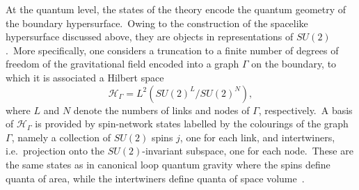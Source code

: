 \documentclass[11pt]{article}
\theoremstyle{definition}
\numberwithin{equation}{section}
\begin{document}
    At the quantum level, the states of the theory encode the quantum geometry of the boundary hypersurface.~Owing to the construction of the spacelike hypersurface discussed above, they are objects in representations of $SU(2)$.~More specifically, one considers a truncation to a finite number of degrees of freedom of the gravitational field encoded into a graph $\Gamma$ on the boundary, to which it is associated a Hilbert space
    \begin{equation}\label{eq:bdyHkin}
    \mathcal{H}_\Gamma = L^2\!\left(SU(2)^{L}/SU(2)^N\right),
    \end{equation}
    where $L$ and $N$ denote the numbers of links and nodes of $\Gamma$, respectively.~A basis of $\mathcal H_{\Gamma}$ is provided by spin-network states labelled by the colourings of the graph $\Gamma$, namely a collection of $SU(2)$ spins $j$, one for each link, and intertwiners, i.e.\ projection onto the $SU(2)$-invariant subspace, one for each node.~These are the same states as in canonical loop quantum gravity where the spins define quanta of area, while the intertwiners define quanta of space volume~\cite{Rovelli_2004, Thiemann_2007, Rovelli_Vidotto_2014}. 
\end{document}
